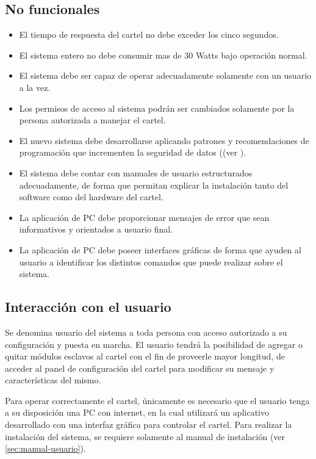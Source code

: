 \subsection{No funcionales}
\begin{itemize}
	\item El tiempo de respuesta del cartel no debe exceder los cinco segundos.
	\item El sistema entero no debe consumir mas de 30 Watts bajo operación normal.
	\item El sistema debe ser capaz de operar adecuadamente solamente con un usuario a la vez.
	\item Los permisos de acceso al sistema podrán ser cambiados solamente por la persona autorizada a manejar el cartel.
	\item El nuevo sistema debe desarrollarse aplicando patrones y recomendaciones de programación que incrementen la seguridad de datos ((ver \cite{Patrones}).
	\item El sistema debe contar con manuales de usuario estructurados adecuadamente, de forma que permitan explicar la instalación tanto del software como del hardware del cartel.
	\item La aplicación de PC debe proporcionar mensajes de error que sean informativos y orientados a usuario final.
	\item La aplicación de PC debe poseer interfaces gráficas de forma que ayuden al usuario a identificar los distintos comandos que puede realizar sobre el sistema.
\end{itemize}

\subsection{Interacción con el usuario}
	
	Se denomina usuario del sistema a toda persona con acceso autorizado a su configuración y puesta en marcha.	El usuario tendrá la posibilidad de agregar o quitar módulos esclavos al cartel con el fin de proveerle mayor longitud, de acceder al panel de configuración del cartel para modificar su mensaje y características del mismo.
	
	Para operar correctamente el cartel, únicamente es necesario que el usuario tenga a su disposición una PC con internet, en la cual utilizará un aplicativo desarrollado con una interfaz gráfica para controlar el cartel. Para realizar la instalación del sistema, se requiere solamente al manual de instalación (ver \ref{sec:manual-usuario}). %

